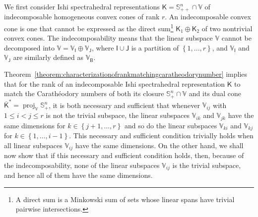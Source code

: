 \documentclass[oneside]{amsart}
\theoremstyle{plain}
\theoremstyle{definition}
\theoremstyle{remark}
\numberwithin{equation}{section}
\DeclareMathOperator{\proj}{proj}
\begin{document}
We first consider Ishi spectrahedral representations $\mathsf{K} =
\mathbb{S}^{n}_{++} \cap \mathbb{V}$ of indecomposable homogeneous convex
cones of rank $r$. An indecomposable convex cone is one that cannot be
expressed as the direct sum\footnote{A direct sum is a Minkowski sum of
sets whose linear spans have trivial pairwise intersections.} $\mathsf{K}_1
\oplus \mathsf{K}_2$ of two nontrivial convex cones. The indecomposability
means that the linear subspace $\mathbb{V}$ cannot be decomposed into
$\mathbb{V} = \mathbb{V}_{\mathsf{I}} \oplus \mathbb{V}_{\mathsf{J}}$,
where $\mathsf{I} \cup \mathsf{J}$ is a partition of $\left\{1, \dotsc,
r\right\}$, and $\mathbb{V}_{\mathsf{I}}$ and $\mathbb{V}_{\mathsf{J}}$ are
similarly defined as $\mathbb{V}_{\mathsf{B}}$.

Theorem~\ref{theorem:characterizationofrankmatchingcaratheodorynumber}
implies that for the rank of an indecomposable Ishi spectrahedral
representation $\mathsf{K}$ to match the Carath\'eodory numbers of both its
closure $\mathbb{S}^{n}_{+} \cap \mathbb{V}$ and its dual cone
$\bar{\mathsf{K}}^{*} = \proj_{\mathbb{V}} \mathbb{S}^{n}_{+}$, it is both
necessary and sufficient that whenever $\mathbb{V}_{ij}$ with $1 \leq i < j
\leq r$ is not the trivial subspace, the linear subspaces $\mathbb{V}_{ik}$
and $\mathbb{V}_{jk}$ have the same dimensions for $k \in \left\{j+1,
\dotsc, r\right\}$ and so do the linear subspaces $\mathbb{V}_{ki}$ and
$\mathbb{V}_{kj}$ for $k \in \left\{1, \dotsc, i-1\right\}$. This necessary
and sufficient condition trivially holds when all linear subspaces
$\mathbb{V}_{ij}$ have the same dimensions. On the other hand, we shall now
show that if this necessary and sufficient condition holds, then, because
of the indecomposability, none of the linear subspaces $\mathbb{V}_{ij}$ is
the trivial subspace, and hence all of them have the same dimensions.
\end{document}
